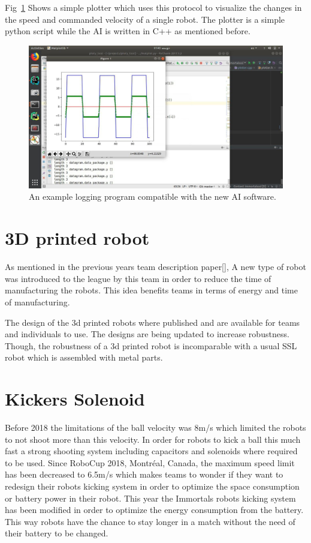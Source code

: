 \documentclass[runningheads]{llncs}
\begin{document}
Fig~\ref{fig1_plotter} Shows a simple plotter which uses this protocol to visualize the changes in the speed and commanded velocity of a single robot. The plotter is a simple python script while the AI is written in C++ as mentioned before.

\begin{figure}
\includegraphics[width=\textwidth]{images/plotter.jpg}
\caption{An example logging program compatible with the new AI software.} \label{fig1_plotter}
\end{figure}

\section{3D printed robot}
As mentioned in the previous years team description paper[], A new type of robot was introduced to the league by this team in order to reduce the time of manufacturing the robots. This idea benefits teams in terms of energy and time of manufacturing.

The design of the 3d printed robots where published and are available for teams and individuals to use. The designs are being updated to increase robustness. Though, the robustness of a 3d printed robot is incomparable with a usual SSL robot which is assembled with metal parts.

\section{Kickers Solenoid}
Before 2018 the limitations of the ball velocity was 8m/s which limited the robots to not shoot more than this velocity. In order for robots to kick a ball this much fast a strong shooting system including capacitors and solenoids where required to be used. Since RoboCup 2018, Montréal, Canada, the maximum speed limit has been decreased to 6.5m/s which makes teams to wonder if they want to redesign their robots kicking system in order to optimize the space consumption or battery power in their robot. This year the Immortals robots kicking system has been modified in order to optimize the energy consumption from the battery. This way robots have the chance to stay longer in a match without the need of their battery to be changed.
\end{document}
